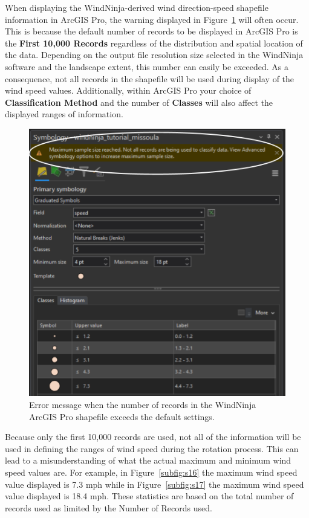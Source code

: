 \documentclass[12pt]{article}
\begin{document}
When displaying the WindNinja-derived wind direction-speed shapefile information in ArcGIS Pro, the warning displayed in Figure~\ref{fig:Figure16} will often occur. This is because the default number of records to be displayed in ArcGIS Pro is the \textbf{First 10,000 Records} regardless of the distribution and spatial location of the data. Depending on the output file resolution size selected in the WindNinja software and the landscape extent, this number can easily be exceeded. As a consequence, not all records in the shapefile will be used during display of the wind speed values. Additionally, within ArcGIS Pro your choice of \textbf{Classification Method} and the number of \textbf{Classes} will also affect the displayed ranges of information.

\begin{figure}[H]
	\centering
	\includegraphics[scale=0.55]{arc_7.png}
	\caption{Error message when the number of records in the WindNinja ArcGIS Pro shapefile exceeds the default settings.}
\label{fig:Figure16}
\end{figure}

Because only the first 10,000 records are used, not all of the information will be used in defining the ranges of wind speed during the rotation process. This can lead to a misunderstanding of what the actual maximum and minimum wind speed values are. For example, in Figure~\ref{subfig:s16} the maximum wind speed value displayed is 7.3 mph while in Figure~\ref{subfig:s17} the maximum wind speed value displayed is 18.4 mph. These statistics are based on the total number of records used as limited by the Number of Records used.
\end{document}
